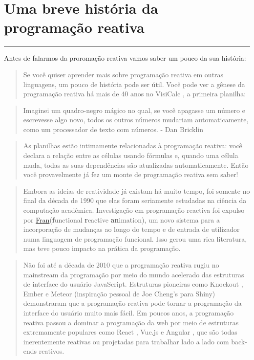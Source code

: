 \documentclass[
]{book}
\begin{document}
\hypertarget{uma-breve-histuxf3ria-da-programauxe7uxe3o-reativa}{%
\chapter{\texorpdfstring{\textbf{Uma breve história da programação reativa}}{Uma breve história da programação reativa}}\label{uma-breve-histuxf3ria-da-programauxe7uxe3o-reativa}}

\begin{center}\rule{0.5\linewidth}{0.5pt}\end{center}

Antes de falarmos da proromação reativa vamos saber um pouco da sua história:

\begin{quote}
Se você quiser aprender mais sobre programação reativa em outras linguagens, um pouco de história pode ser útil. Você pode ver a gênese da programação reativa há mais de 40 anos no VisiCalc , a primeira planilha:
\end{quote}

\begin{quote}
Imaginei um quadro-negro mágico no qual, se você apagasse um número e escrevesse algo novo, todos os outros números mudariam automaticamente, como um processador de texto com números.
- Dan Bricklin
\end{quote}

\begin{quote}
As planilhas estão intimamente relacionadas à programação reativa: você declara a relação entre as células usando fórmulas e, quando uma célula muda, todas as suas dependências são atualizadas automaticamente. Então você provavelmente já fez um monte de programação reativa sem saber!
\end{quote}

\begin{quote}
Embora as ideias de reatividade já existam há muito tempo, foi somente no final da década de 1990 que elas foram seriamente estudadas na ciência da computação acadêmica. Investigação em programação reactiva foi expulso por \href{http://conal.net/papers/icfp97/}{Fran}(\textbf{f}unctional \textbf{r}eactive \textbf{an}imation), um novo sistema para a incorporação de mudanças ao longo do tempo e de entrada de utilizador numa linguagem de programação funcional. Isso gerou uma rica literatura, mas teve pouco impacto na prática da programação.
\end{quote}

\begin{quote}
Não foi até a década de 2010 que a programação reativa rugiu no mainstream da programação por meio do mundo acelerado das estruturas de interface do usuário JavaScript. Estruturas pioneiras como Knockout , Ember e Meteor (inspiração pessoal de Joe Cheng's para Shiny) demonstraram que a programação reativa pode tornar a programação da interface do usuário muito mais fácil. Em poucos anos, a programação reativa passou a dominar a programação da web por meio de estruturas extremamente populares como React , Vue.js e Angular , que são todas inerentemente reativas ou projetadas para trabalhar lado a lado com back-ends reativos.
\end{quote}
\end{document}
